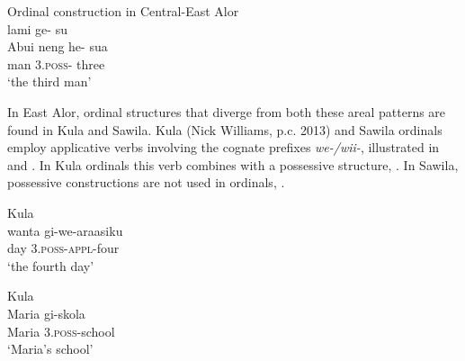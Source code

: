 \let\eachwordone=\itshape
\let\eachwordtwo=\itshape 


\ea%
\label{bkm:Ref342309284}
{\upshape Ordinal construction in Central-East Alor}\\ 
   lami  ge- su \\  
    {\upshape Abui}     neng  he-  sua   \\
    { }  man  3\textsc{.poss-}  three\\
\glt  `the third man'
\z 



\let\eachwordone=\itshape
\let\eachwordtwo=\upshape 

In East Alor, ordinal structures that diverge from both these areal patterns are found in Kula and Sawila. Kula (Nick Williams, p.c. 2013) and Sawila ordinals employ applicative verbs involving the cognate prefixes \textit{we-/wii-}, illustrated in  and . In Kula ordinals this verb combines with a possessive structure, . In Sawila, possessive constructions  are not used in ordinals, . 


\ea%
\label{bkm:Ref355275027}
 
{\upshape Kula}\\
\gll wanta   gi-we-araasiku\\  
  day   3.\textsc{poss}{}-\textsc{appl}{}-four  \\
\glt  `the fourth day'
\z
 

\ea%
\label{bkm:Ref358037937}
{\upshape Kula}\\
\gll Maria   gi-skola\\  
   Maria   3.\textsc{poss-}school \\
\glt`Maria's school'
\z
 
